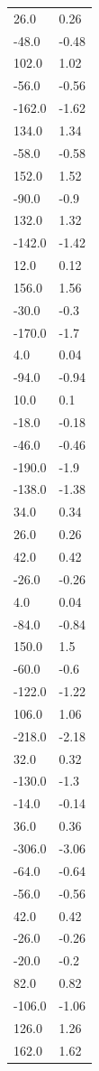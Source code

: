 \begin{longtable}{ll}
26.0 & 0.26 \\
-48.0 & -0.48 \\
102.0 & 1.02 \\
-56.0 & -0.56 \\
-162.0 & -1.62 \\
134.0 & 1.34 \\
-58.0 & -0.58 \\
152.0 & 1.52 \\
-90.0 & -0.9 \\
132.0 & 1.32 \\
-142.0 & -1.42 \\
12.0 & 0.12 \\
156.0 & 1.56 \\
-30.0 & -0.3 \\
-170.0 & -1.7 \\
4.0 & 0.04 \\
-94.0 & -0.94 \\
10.0 & 0.1 \\
-18.0 & -0.18 \\
-46.0 & -0.46 \\
-190.0 & -1.9 \\
-138.0 & -1.38 \\
34.0 & 0.34 \\
26.0 & 0.26 \\
42.0 & 0.42 \\
-26.0 & -0.26 \\
4.0 & 0.04 \\
-84.0 & -0.84 \\
150.0 & 1.5 \\
-60.0 & -0.6 \\
-122.0 & -1.22 \\
106.0 & 1.06 \\
-218.0 & -2.18 \\
32.0 & 0.32 \\
-130.0 & -1.3 \\
-14.0 & -0.14 \\
36.0 & 0.36 \\
-306.0 & -3.06 \\
-64.0 & -0.64 \\
-56.0 & -0.56 \\
42.0 & 0.42 \\
-26.0 & -0.26 \\
-20.0 & -0.2 \\
82.0 & 0.82 \\
-106.0 & -1.06 \\
126.0 & 1.26 \\
162.0 & 1.62 \\

\end{longtable}
